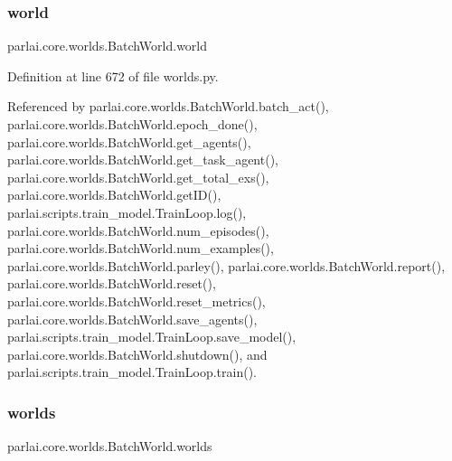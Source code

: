 \mbox{\label{classparlai_1_1core_1_1worlds_1_1BatchWorld_ad7d651ac0fb1ee9b52ba7f134602e98e}} 
\subsubsection{\texorpdfstring{world}{world}}
{\footnotesize\ttfamily parlai.\+core.\+worlds.\+Batch\+World.\+world}



Definition at line 672 of file worlds.\+py.



Referenced by parlai.\+core.\+worlds.\+Batch\+World.\+batch\+\_\+act(), parlai.\+core.\+worlds.\+Batch\+World.\+epoch\+\_\+done(), parlai.\+core.\+worlds.\+Batch\+World.\+get\+\_\+agents(), parlai.\+core.\+worlds.\+Batch\+World.\+get\+\_\+task\+\_\+agent(), parlai.\+core.\+worlds.\+Batch\+World.\+get\+\_\+total\+\_\+exs(), parlai.\+core.\+worlds.\+Batch\+World.\+get\+I\+D(), parlai.\+scripts.\+train\+\_\+model.\+Train\+Loop.\+log(), parlai.\+core.\+worlds.\+Batch\+World.\+num\+\_\+episodes(), parlai.\+core.\+worlds.\+Batch\+World.\+num\+\_\+examples(), parlai.\+core.\+worlds.\+Batch\+World.\+parley(), parlai.\+core.\+worlds.\+Batch\+World.\+report(), parlai.\+core.\+worlds.\+Batch\+World.\+reset(), parlai.\+core.\+worlds.\+Batch\+World.\+reset\+\_\+metrics(), parlai.\+core.\+worlds.\+Batch\+World.\+save\+\_\+agents(), parlai.\+scripts.\+train\+\_\+model.\+Train\+Loop.\+save\+\_\+model(), parlai.\+core.\+worlds.\+Batch\+World.\+shutdown(), and parlai.\+scripts.\+train\+\_\+model.\+Train\+Loop.\+train().

\mbox{\label{classparlai_1_1core_1_1worlds_1_1BatchWorld_ae1b967d3229b90064ff50c1a55dc2b96}} 
\subsubsection{\texorpdfstring{worlds}{worlds}}
{\footnotesize\ttfamily parlai.\+core.\+worlds.\+Batch\+World.\+worlds}



